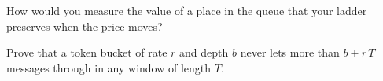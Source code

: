 \begin{interviewq}\label{iq:hf:the-quoting-engine:5}
How would you measure the value of a place in the queue that your ladder preserves when the price moves?
\end{interviewq}

\begin{interviewq}\label{iq:hf:the-quoting-engine:6}
Prove that a token bucket of rate $r$ and depth $b$ never lets more than $b+r\,T$ messages through in any window of length $T$.
\end{interviewq}
